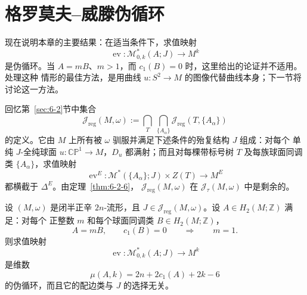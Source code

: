 
\section{格罗莫夫--威滕伪循环}\label{sec:6-6}

现在说明本章的主要结果：在适当条件下，求值映射
\[
  \operatorname{ev}:\mathcal M^*_{0,k}(A;J)\longrightarrow M^k
\]
是伪循环。当 $A=mB$、$m>1$，而 $c_1(B)=0$ 时，这里给出的论证并不适用。处理这种
情形的最佳方法，是用曲线 $u:S^2\to M$ 的图像代替曲线本身；下一节将讨论这一方法。

回忆第~\ref{sec:6-2}节中集合
\[
  \mathcal J_{\mathrm{reg}}(M,\omega)
  :=\bigcap_T\ \bigcap_{\{A_\alpha\}}
    \mathcal J_{\mathrm{reg}}(T,\{A_\alpha\})
\]
的定义。它由 $M$ 上所有被 $\omega$ 驯服并满足下述条件的殆复结构 $J$ 组成：对每个
单纯 $J$-全纯球面 $u:\mathbb{CP}^1\to M$，$D_u$ 都满射；而且对每棵带标号树 $T$
及每族球面同调类 $\{A_\alpha\}$，求值映射
\[
  \operatorname{ev}^E:
  \mathcal M^*(\{A_\alpha\};J)\times Z(T)
  \longrightarrow M^E
\]
都横截于 $\Delta^E$。由定理~\ref{thm:6-2-6}，
$\mathcal J_{\mathrm{reg}}(M,\omega)$ 在
$\mathcal J_\tau(M,\omega)$ 中是剩余的。

\begin{theorem}\label{thm:6-6-1}
设 $(M,\omega)$ 是闭半正辛 $2n$-流形，且
$J\in\mathcal J_{\mathrm{reg}}(M,\omega)$。设 $A\in H_2(M;\mathbb Z)$ 满足：对每个
正整数 $m$ 和每个球面同调类 $B\in H_2(M;\mathbb Z)$，
\begin{equation}\label{eq:6-6-1}
  A=mB,\qquad c_1(B)=0
  \qquad\Longrightarrow\qquad m=1.
\end{equation}
则求值映射
\[
  \operatorname{ev}:\mathcal M^*_{0,k}(A;J)\longrightarrow M^k
\]
是维数
\[
  \mu(A,k)=2n+2c_1(A)+2k-6
\]
的伪循环，而且它的配边类与 $J$ 的选择无关。
\end{theorem}

